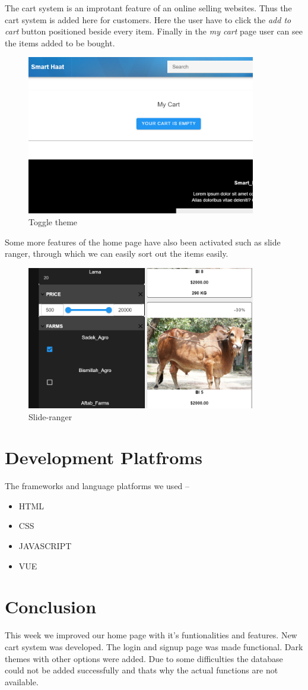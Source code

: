 \documentclass[a4paper,12pt]{report}
\begin{document}
The cart system is an improtant feature of an online selling websites. Thus the cart system is added here for customers. Here the user have to click the \emph{add to cart} button positioned beside every item. Finally in the \emph{my cart} page user can see the items added to be bought.
\begin{figure}[H]
\centering
\includegraphics[keepaspectratio, width=10cm]{three.png}
\caption{Toggle theme}
\label{cart}
\end{figure}
Some more features of the home page have also been activated such as slide ranger, through which we can easily sort out the items easily.
\begin{figure}[H]
\centering
\includegraphics[keepaspectratio, width=10cm]{four.png}
\caption{Slide-ranger}
\label{slideranger}
\end{figure}
\section*{Development Platfroms}
The frameworks and language platforms we used --
\begin{itemize}
	\item HTML
	\item CSS
	\item JAVASCRIPT
	\item VUE
\end{itemize}

\section*{Conclusion}
This week we improved our home page with it's funtionalities and features. New cart system was developed. The login and signup page was made functional. Dark themes with other options were added. Due to some difficulties the database could not be added successfully and thats why the actual functions are not available.
\end{document}
